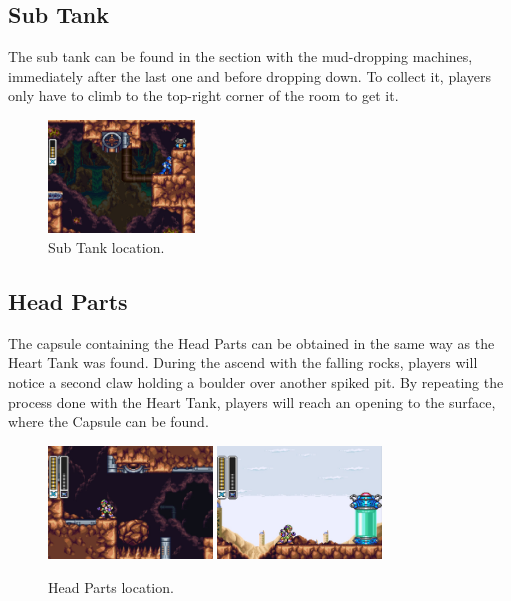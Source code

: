 \subsection{Sub Tank}
The sub tank can be found in the section with the mud-dropping machines, immediately after the last one and before dropping down. To collect it, players only have to climb to the top-right corner of the room to get it.
\begin{figure}[htp]
	\centering
	\includegraphics[height=3cm]{figures/X3/Tunnel_rhino/tank.jpg}
	\caption{Sub Tank location.}
\end{figure}
\subsection{Head Parts}
The capsule containing the Head Parts can be obtained in the same way as the Heart Tank was found. During the ascend with the falling rocks, players will notice a second claw holding a boulder over another spiked pit. By repeating the process done with the Heart Tank, players will reach an opening to the surface, where the Capsule can be found.
\begin{figure}[htp]
	\centering
	\includegraphics[height=3cm]{figures/X3/Tunnel_rhino/Armor_1.png}
	\includegraphics[height=3cm]{figures/X3/Tunnel_rhino/Armor_2.png}
	\caption{Head Parts location.}
\end{figure}

